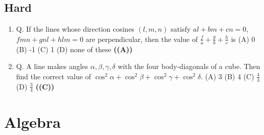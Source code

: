 \documentclass{article}
\begin{document}
\subsection{Hard}
\begin{enumerate}
\item Q. If the lines whose direction cosines $(l, m, n)$ satisfy $al + bm + cn =0$, $fmn+gnl+hlm=0$ are perpendicular, then the value of $\frac{f}{a} + \frac{g}{b} + \frac{h}{c}$ is
(A) 0
(B) -1
(C) 1
(D) none of these \hfill \textbf{((A))}
\item Q. A line makes angles $\alpha, \beta, \gamma, \delta$ with the four body-diagonals of a cube. Then find the correct value of $\cos^2 \alpha + \cos^2 \beta + \cos^2 \gamma + \cos^2 \delta$.
(A) 3
(B) 4
(C) $\frac{4}{3}$
(D) $\frac{3}{4}$ \hfill \textbf{((C))}
\end{enumerate}
\section{Algebra}
\end{document}
